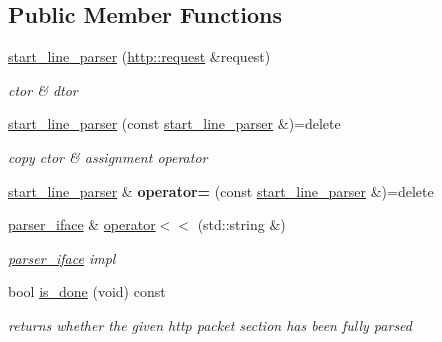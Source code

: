 \subsection*{Public Member Functions}
\begin{DoxyCompactItemize}
\item 
\mbox{\label{classnetflex_1_1parsing_1_1start__line__parser_a8a8554f0cfedc23f4955f5fcd4fa2a30}} 
\hyperlink{classnetflex_1_1parsing_1_1start__line__parser_a8a8554f0cfedc23f4955f5fcd4fa2a30}{start\+\_\+line\+\_\+parser} (\hyperlink{classnetflex_1_1http_1_1request}{http\+::request} \&request)
\begin{DoxyCompactList}\small\item\em ctor \& dtor \end{DoxyCompactList}\item 
\mbox{\label{classnetflex_1_1parsing_1_1start__line__parser_ae86a3442c52945efb4868c0853d89be7}} 
\hyperlink{classnetflex_1_1parsing_1_1start__line__parser_ae86a3442c52945efb4868c0853d89be7}{start\+\_\+line\+\_\+parser} (const \hyperlink{classnetflex_1_1parsing_1_1start__line__parser}{start\+\_\+line\+\_\+parser} \&)=delete
\begin{DoxyCompactList}\small\item\em copy ctor \& assignment operator \end{DoxyCompactList}\item 
\mbox{\label{classnetflex_1_1parsing_1_1start__line__parser_a38a89b7c84cfcf444a519920f45b1b7e}} 
\hyperlink{classnetflex_1_1parsing_1_1start__line__parser}{start\+\_\+line\+\_\+parser} \& {\bfseries operator=} (const \hyperlink{classnetflex_1_1parsing_1_1start__line__parser}{start\+\_\+line\+\_\+parser} \&)=delete
\item 
\mbox{\label{classnetflex_1_1parsing_1_1start__line__parser_a663858012ee38e99d0c39444221bf4b5}} 
\hyperlink{classnetflex_1_1parsing_1_1parser__iface}{parser\+\_\+iface} \& \hyperlink{classnetflex_1_1parsing_1_1start__line__parser_a663858012ee38e99d0c39444221bf4b5}{operator$<$$<$} (std\+::string \&)
\begin{DoxyCompactList}\small\item\em \hyperlink{classnetflex_1_1parsing_1_1parser__iface}{parser\+\_\+iface} impl \end{DoxyCompactList}\item 
\mbox{\label{classnetflex_1_1parsing_1_1start__line__parser_a7b32cf1d39bfaa78d76dff258d984f95}} 
bool \hyperlink{classnetflex_1_1parsing_1_1start__line__parser_a7b32cf1d39bfaa78d76dff258d984f95}{is\+\_\+done} (void) const
\begin{DoxyCompactList}\small\item\em returns whether the given http packet section has been fully parsed \end{DoxyCompactList}\end{DoxyCompactItemize}
